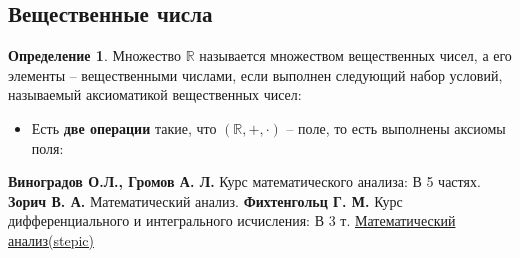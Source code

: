 \documentclass[14pt, a4paper]{article}
\theoremstyle{definition}
\newtheorem{definition}{Определение}[section]
\theoremstyle{remark}
\begin{document}
\subsection{Вещественные числа}
\begin{definition}
Множество $\mathbb{R}$ называется множеством вещественных чисел, а его элементы -- вещественными числами, если выполнен следующий набор условий,
называемый аксиоматикой вещественных чисел:
\begin{itemize}
    \item[1)] Есть \textbf{две операции} такие, что $(\mathbb{R}, +, \cdot)$ -- поле, то есть выполнены аксиомы поля:
\end{itemize}
\end{definition}

\begin{thebibliography}{2}
 \textbf{Виноградов О.Л., Громов А. Л.} Курс математического анализа: В 5 частях.
 \textbf{Зорич В. А.} Математический анализ.
 \textbf{Фихтенгольц Г. М.} Курс дифференциального и интегрального исчисления: В 3 т.
 \href{https://stepik.org/course/716/info}{Математический анализ(stepic)}
\end{thebibliography}
\end{document}
